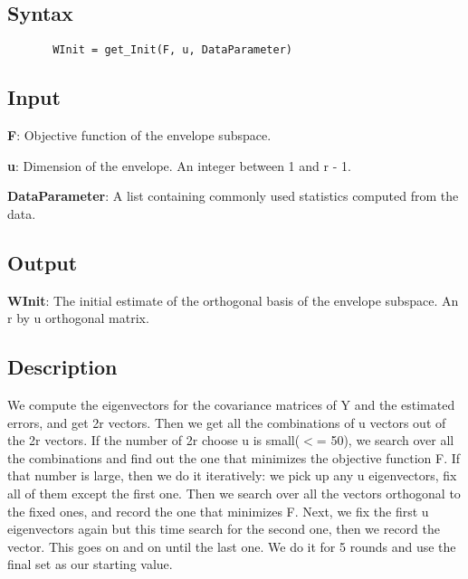 \documentclass[a4paper,11pt,openany]{memoir}
\begin{document}
\subsection*{Syntax}


\begin{verbatim}       WInit = get_Init(F, u, DataParameter)\end{verbatim}
    

\subsection*{Input}

\begin{par}
\textbf{F}: Objective function of the envelope subspace.
\end{par} \vspace{1em}
\begin{par}
\textbf{u}: Dimension of the envelope. An integer between 1 and r - 1.
\end{par} \vspace{1em}
\begin{par}
\textbf{DataParameter}: A list containing commonly used statistics computed from the data.
\end{par} \vspace{1em}


\subsection*{Output}

\begin{par}
\textbf{WInit}: The initial estimate of the orthogonal basis of the envelope subspace. An r by u orthogonal matrix.
\end{par} \vspace{1em}


\subsection*{Description}

\begin{par}
We compute the eigenvectors for the covariance matrices of Y and the estimated errors, and get 2r vectors.  Then we get all the combinations of u vectors out of the 2r vectors. If the number of 2r choose u is small(\ensuremath{<}= 50), we search over all the combinations and find out the one that minimizes the objective function F. If that number is large, then we do it iteratively: we pick up any u eigenvectors, fix all of them except the first one. Then we search over all the vectors orthogonal to the fixed ones, and record the one that minimizes F. Next, we fix the first u eigenvectors again but this time search for the second one, then we record the vector. This goes on and on until the last one. We do it for 5 rounds and use the final set as our starting value.
\end{par} \vspace{1em}
\end{document}

